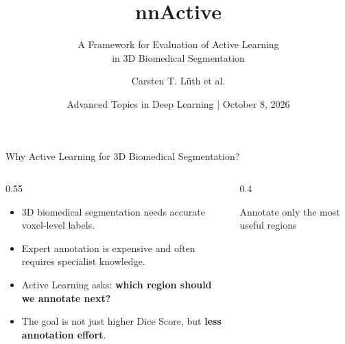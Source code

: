 \documentclass[aspectratio=169,11pt]{beamer}
\title{nnActive}
\subtitle{\texorpdfstring{A Framework for Evaluation of Active Learning\\in 3D Biomedical Segmentation}{A Framework for Evaluation of Active Learning in 3D Biomedical Segmentation}}
\author{Carsten T. L\"uth et al.}
\date{Advanced Topics in Deep Learning \enspace | \enspace October 8, 2026}
\begin{document}
{
\begin{frame}[plain]
\vspace{0.55cm}\titlepage
\vspace{0.25cm}
\end{frame}}


\begin{frame}{Why Active Learning for 3D Biomedical Segmentation?}

\begin{columns}[T]
\begin{column}{0.55\textwidth}
\begin{itemize}
    \item 3D biomedical segmentation needs accurate voxel-level labels.
    \item Expert annotation is expensive and often requires specialist knowledge.
    \item Active Learning asks: \textbf{which region should we annotate next?}
    \item The goal is not just higher Dice Score, but \textbf{less annotation effort}.
\end{itemize}
\end{column}

\begin{column}{0.4\textwidth}
\centering
{}

\vspace{0.3cm}
\small Annotate only the most useful regions
\end{column}
\end{columns}

\end{frame}
\end{document}
